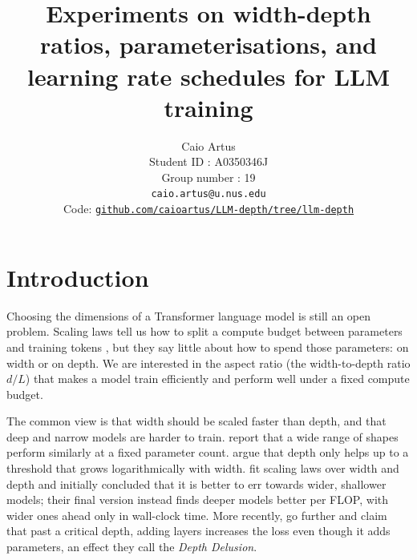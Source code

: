 \documentclass[10pt,twocolumn,a4paper]{article}
\title{\textbf{Experiments on width-depth ratios, parameterisations, and learning rate schedules for LLM training}}
\author{
    Caio Artus\\
    \small Student ID : A0350346J\\
    \small Group number : 19\\
    \small \texttt{caio.artus@u.nus.edu}\\
    \small Code: \href{https://github.com/caioartus/LLM-depth/tree/llm-depth}{\texttt{github.com/caioartus/LLM-depth/tree/llm-depth}}
}
\date{}
\begin{document}

\section{Introduction}


Choosing the dimensions of a Transformer \citep{vaswani2017attention} language model is still an open problem. Scaling laws tell us how to split a compute budget between parameters and training tokens \citep{kaplan2020scaling,hoffmann2022training}, but they say little about how to spend those parameters: on width or on depth. We are interested in the aspect ratio (the width-to-depth ratio $d/L$) that makes a model train efficiently and perform well under a fixed compute budget.

The common view is that width should be scaled faster than depth, and that deep and narrow models are harder to train. \citet{kaplan2020scaling} report that a wide range of shapes perform similarly at a fixed parameter count. \citet{levine2020limits} argue that depth only helps up to a threshold that grows logarithmically with width. \citet{mcleish2025gemstones_v1} fit scaling laws over width and depth and initially concluded that it is better to err towards wider, shallower models; their final version \citep{mcleish2025gemstones} instead finds deeper models better per FLOP, with wider ones ahead only in wall-clock time. More recently, \citet{fahim2026depth} go further and claim that past a critical depth, adding layers increases the loss even though it adds parameters, an effect they call the \emph{Depth Delusion}.
\end{document}
